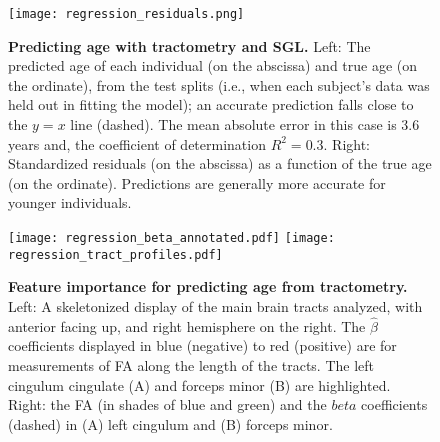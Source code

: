 \begin{figure}[h]
    \centering
    \texttt{[image: regression\_residuals.png]}
    \caption{{\bf Predicting age with tractometry and SGL.} Left: The predicted
    age of each individual (on the abscissa) and true age (on the ordinate),
    from the test splits (i.e., when each subject's data was held out in fitting
    the model); an accurate prediction falls close to the $y=x$ line (dashed).
    The mean absolute error in this case is 3.6 years and, the coefficient of
    determination $R^2=0.3$. Right: Standardized residuals (on the abscissa) as
    a function of the true age (on the ordinate). Predictions are generally more
    accurate for younger individuals.}
    \label{fig:regress-results}
\end{figure}

\begin{figure}[h]
    \centering
    \texttt{[image: regression\_beta\_annotated.pdf]}
    \texttt{[image: regression\_tract\_profiles.pdf]}
    \caption{{\bf Feature importance for predicting age from tractometry.} Left:
    A skeletonized display of the main brain tracts analyzed, with anterior
    facing up, and right hemisphere on the right. The $\hat{\beta}$ coefficients
    displayed in blue (negative) to red (positive) are for measurements of FA
    along the length of the tracts. The left cingulum cingulate (A) and forceps
    minor (B) are highlighted. Right: the FA (in shades of blue and green) and
    the $beta$ coefficients (dashed) in (A) left cingulum and (B) forceps
    minor.}
    \label{fig:regress-beta}
\end{figure}

